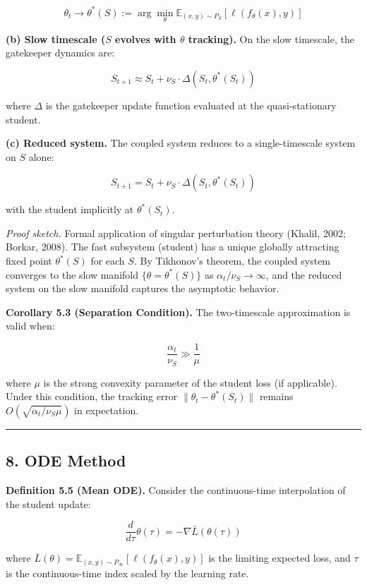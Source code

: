 \documentclass[
  12pt,
]{article}
\begin{document}
\[
\theta_t \to \theta^*(S) := \arg\min_{\theta} \mathbb{E}_{(x,y) \sim P_S}[\ell(f_\theta(x), y)]
\]

\textbf{(b) Slow timescale (\(S\) evolves with \(\theta\) tracking).} On
the slow timescale, the gatekeeper dynamics are:

\[
S_{t+1} \approx S_t + \nu_S \cdot \Delta(S_t, \theta^*(S_t))
\]

where \(\Delta\) is the gatekeeper update function evaluated at the
quasi-stationary student.

\textbf{(c) Reduced system.} The coupled system reduces to a
single-timescale system on \(S\) alone:

\[
S_{t+1} = S_t + \nu_S \cdot \Delta(S_t, \theta^*(S_t))
\]

with the student implicitly at \(\theta^*(S_t)\).

\emph{Proof sketch.} Formal application of singular perturbation theory
(Khalil, 2002; Borkar, 2008). The fast subsystem (student) has a unique
globally attracting fixed point \(\theta^*(S)\) for each \(S\). By
Tikhonov's theorem, the coupled system converges to the slow manifold
\(\{\theta = \theta^*(S)\}\) as \(\alpha_t/\nu_S \to \infty\), and the
reduced system on the slow manifold captures the asymptotic behavior.

\textbf{Corollary 5.3 (Separation Condition).} The two-timescale
approximation is valid when:

\[
\frac{\alpha_t}{\nu_S} \gg \frac{1}{\mu}
\]

where \(\mu\) is the strong convexity parameter of the student loss (if
applicable). Under this condition, the tracking error
\(\|\theta_t - \theta^*(S_t)\|\) remains
\(O(\sqrt{\alpha_t/\nu_S \mu})\) in expectation.

\begin{center}\rule{0.5\linewidth}{0.5pt}\end{center}

\subsection{8. ODE Method}\label{ode-method}

\textbf{Definition 5.5 (Mean ODE).} Consider the continuous-time
interpolation of the student update:

\[
\frac{d}{d\tau} \theta(\tau) = -\nabla \bar{L}(\theta(\tau))
\]

where
\(\bar{L}(\theta) = \mathbb{E}_{(x,y) \sim P_\infty}[\ell(f_\theta(x), y)]\)
is the limiting expected loss, and \(\tau\) is the continuous-time index
scaled by the learning rate.
\end{document}
